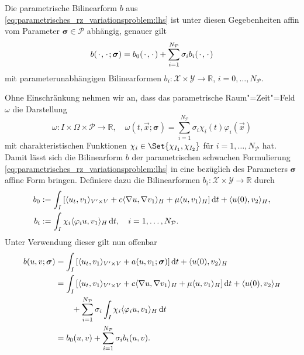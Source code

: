 \documentclass[../main.tex]{subfiles}
\begin{document}
\begin{Lemma}
\label{lemma:bilinearform_affin_parametrisch}
    Die parametrische Bilinearform $b$ aus \cref{eq:parametrisches_rz_variationsproblem:lhs} ist unter diesen Gegebenheiten affin vom Parameter $\bm \sigma \in \mathcal P$ abhängig, genauer gilt
    \begin{equation}
        b({\mkern2mu\cdot\mkern2mu}, {\mkern2mu\cdot\mkern2mu}; \bm \sigma) = b_{0}({\mkern2mu\cdot\mkern2mu}, {\mkern2mu\cdot\mkern2mu}) + \sum_{i = 1}^{N_{\mathcal P}} \sigma_{i} b_{i}({\mkern2mu\cdot\mkern2mu}, {\mkern2mu\cdot\mkern2mu})
    \end{equation}
    mit parameterunabhängigen Bilinearformen $b_{i} \colon \mathcal X \times \mathcal Y \to \mathbb{R}$, $i = 0, \dots, N_{\mathcal P}$.

    \begin{Beweis}
        Ohne Einschränkung nehmen wir an, dass das parametrische Raum"=Zeit"=Feld $\omega$ die Darstellung
        \begin{equation}
            \omega \colon I \times \Omega \times \mathcal P \to \mathbb{R}, \quad
            \omega(t, \vec{x}; \bm \sigma) = \sum_{i = 1}^{N_{\mathcal P}} \sigma_{i} \chi_{i}(t) \varphi_{i}(\vec x)
        \end{equation}
        mit charakteristischen Funktionen $\chi_{i} \in \Set{\chi_{I_{1}}, \chi_{I_{2}}}$ für $i = 1, \dots, N_{\mathcal P}$ hat.
        Damit lässt sich die Bilinearform $b$ der parametrischen schwachen Formulierung \cref{eq:parametrisches_rz_variationsproblem:lhs} in eine bezüglich des Parameters $\bm \sigma$ affine Form bringen.
        Definiere dazu die Bilinearformen
        $b_{i} \colon \mathcal X \times \mathcal Y \to \mathbb{R}$ durch
        \begin{equation}
            \begin{aligned}
                b_{0} &:= \int_{I} \left[ \langle u_{t},v_{1}\rangle_{V' \times V} + c\langle\nabla u,\nabla v_{1}\rangle_{H} + \mu \langle u,v_{1}\rangle_{H} \right] \mathop{}\!\mathrm{d} t + \langle u(0),v_{2}\rangle_{H},\\
                b_{i} &:= \int_{I} \chi_{i} \langle\varphi_{i}u,v_{1}\rangle_{H} \mathop{}\!\mathrm{d} t, \quad i = 1, \dots, N_{\mathcal P}.
            \end{aligned}
        \end{equation}
        Unter Verwendung dieser gilt nun offenbar
        \begin{equation}
            \begin{aligned}
                b(u, v; \bm \sigma)
                &= \int_{I} \left[ \langle u_{t},v_{1}\rangle_{V' \times V} + a(u, v_{1}; \bm \sigma) \right] \mathop{}\!\mathrm{d} t + \langle u(0),v_{2}\rangle_{H}
                \\&= \int_{I} \left[ \langle u_{t},v_{1}\rangle_{V' \times V} + c\langle\nabla u,\nabla v_{1}\rangle_{H} + \mu \langle u,v_{1}\rangle_{H} \right] \mathop{}\!\mathrm{d} t + \langle u(0),v_{2}\rangle_{H}
                \\&\qquad + \sum_{i = 1}^{N_{\mathcal P}} \sigma_{i} \int_{I} \chi_{i} \langle\varphi_{i}u,v_{1}\rangle_{H} \mathop{}\!\mathrm{d} t
                \\&= b_{0}(u, v) + \sum_{i = 1}^{N_{\mathcal P}} \sigma_{i} b_{i}(u, v).
            \end{aligned}
        \end{equation}
    \end{Beweis}
\end{Lemma}
\end{document}
